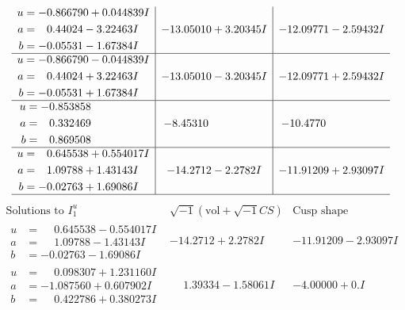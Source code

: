 \documentclass[1p]{elsarticle_modified}
\theoremstyle{definition}
\newcommand{\I}{\sqrt{-1}}
\begin{document}
$$\begin{array}{c|c|c}
\begin{aligned}
u &= -0.866790 + 0.044839 I \\
a &= \phantom{-}0.44024 - 3.22463 I \\
b &= -0.05531 - 1.67384 I\end{aligned}
 & -13.05010 + 3.20345 I & -12.09771 - 2.59432 I \\ \hline\begin{aligned}
u &= -0.866790 - 0.044839 I \\
a &= \phantom{-}0.44024 + 3.22463 I \\
b &= -0.05531 + 1.67384 I\end{aligned}
 & -13.05010 - 3.20345 I & -12.09771 + 2.59432 I \\ \hline\begin{aligned}
u &= -0.853858\phantom{ +0.000000I} \\
a &= \phantom{-}0.332469\phantom{ +0.000000I} \\
b &= \phantom{-}0.869508\phantom{ +0.000000I}\end{aligned}
 & -8.45310\phantom{ +0.000000I} & -10.4770\phantom{ +0.000000I} \\ \hline\begin{aligned}
u &= \phantom{-}0.645538 + 0.554017 I \\
a &= \phantom{-}1.09788 + 1.43143 I \\
b &= -0.02763 + 1.69086 I\end{aligned}
 & -14.2712 - 2.2782 I & -11.91209 + 2.93097 I\\
 \hline 
 \end{array}$$\newpage$$\begin{array}{c|c|c}  
\text{Solutions to }I^u_{1}& \I (\text{vol} + \sqrt{-1}CS) & \text{Cusp shape}\\
 \hline 
\begin{aligned}
u &= \phantom{-}0.645538 - 0.554017 I \\
a &= \phantom{-}1.09788 - 1.43143 I \\
b &= -0.02763 - 1.69086 I\end{aligned}
 & -14.2712 + 2.2782 I & -11.91209 - 2.93097 I \\ \hline\begin{aligned}
u &= \phantom{-}0.098307 + 1.231160 I \\
a &= -1.087560 + 0.607902 I \\
b &= \phantom{-}0.422786 + 0.380273 I\end{aligned}
 & \phantom{-}1.39334 - 1.58061 I & -4.00000 + 0. I\phantom{ +0.000000I} \\ \hline\begin{aligned}

\end{aligned}
\end{array}$$
\end{document}
